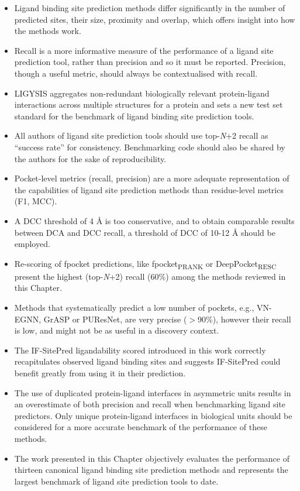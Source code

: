 \begin{itemize}

\item Ligand binding site prediction methods differ significantly in the number of predicted sites, their size, proximity and overlap, which offers insight into how the methods work.

\item Recall is a more informative measure of the performance of a ligand site prediction tool, rather than precision and so it must be reported. Precision, though a useful metric, should always be contextualised with recall.

\item LIGYSIS aggregates non-redundant biologically relevant protein-ligand interactions across multiple structures for a protein and sets a new test set standard for the benchmark of ligand binding site prediction tools. 

\item All authors of ligand site prediction tools should use top-\textit{N}+2 recall as ``success rate'' for consistency. Benchmarking code should also be shared by the authors for the sake of reproducibility.

\item Pocket-level metrics (recall, precision) are a more adequate representation of the capabilities of ligand site prediction methods than residue-level metrics (F1, MCC).

\item A DCC threshold of 4 \AA{} is too conservative, and to obtain comparable results between DCA and DCC recall, a threshold of DCC of 10-12 \AA{} should be employed.

\item Re-scoring of fpocket predictions, like fpocket\textsubscript{PRANK} or DeepPocket\textsubscript{RESC} present the highest (top-\textit{N}+2) recall (60\%) among the methods reviewed in this Chapter.

\item Methods that systematically predict a low number of pockets, e.g., VN-EGNN, GrASP or PUResNet, are very precise ($>$90\%), however their recall is low, and might not be as useful in a discovery context.

\item The IF-SitePred ligandability scored introduced in this work correctly recapitulates observed ligand binding sites and suggests IF-SitePred could benefit greatly from using it in their prediction.

\item The use of duplicated protein-ligand interfaces in asymmetric units results in an overestimate of both precision and recall when benchmarking ligand site predictors. Only unique protein-ligand interfaces in biological units should be considered for a more accurate benchmark of the performance of these methods.

\item The work presented in this Chapter objectively evaluates the performance of thirteen canonical ligand binding site prediction methods and represents the largest benchmark of ligand site prediction tools to date.

\end{itemize}
